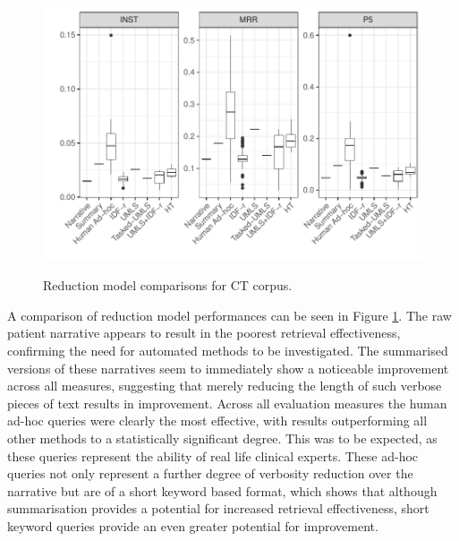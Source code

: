 \documentclass[a4paper]{report}
\begin{document}
\begin{figure}
\centering
\caption{Reduction model comparisons for CT corpus.}
\includegraphics[width=.9\columnwidth]{ctreduction.pdf}
\label{fig:ct_results}
\end{figure}

A comparison of reduction model performances can be seen in Figure \ref{fig:ct_results}. The raw patient narrative appears to result in the poorest retrieval effectiveness, confirming the need for automated methods to be investigated. The summarised versions of these narratives seem to immediately show a noticeable improvement across all measures, suggesting that merely reducing the length of such verbose pieces of text results in improvement. Across all evaluation measures the human ad-hoc queries were clearly the most effective, with results outperforming all other methods to a statistically significant degree. This was to be expected, as these queries represent the ability of real life clinical experts. These ad-hoc queries not only represent a further degree of verbosity reduction over the narrative but are of a short keyword based format, which shows that although summarisation provides a potential for increased retrieval effectiveness, short keyword queries provide an even greater potential for improvement.
\end{document}
